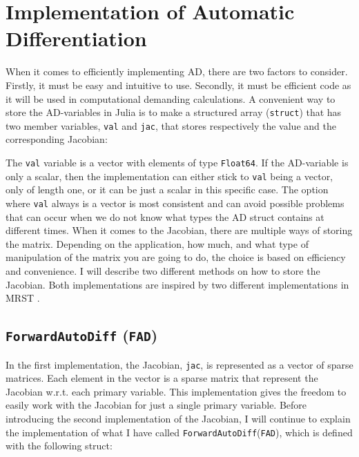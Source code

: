 \section{Implementation of Automatic Differentiation}
\label{sec:ImplementationAD}
When it comes to efficiently implementing AD, there are two factors to consider. Firstly, it must be easy and intuitive to use. Secondly, it must be efficient code as it will be used in computational demanding calculations. A convenient way to store the AD-variables in Julia is to make a structured array (\texttt{struct}) that has two member variables, \texttt{val} and \texttt{jac}, that stores respectively the value and the corresponding Jacobian: 
 
The \texttt{val} variable is a vector with elements of type \texttt{Float64}. If the AD-variable is only a scalar, then the implementation can either stick to \texttt{val} being a vector, only of length one, or it can be just a scalar in this specific case. The option where \texttt{val} always is a vector is most consistent and can avoid possible problems that can occur when we do not know what types the AD struct contains at different times. When it comes to the Jacobian, there are multiple ways of storing the matrix. Depending on the application, how much, and what type of manipulation of the matrix you are going to do, the choice is based on efficiency and convenience. I will describe two different methods on how to store the Jacobian. Both implementations are inspired by two different implementations in MRST \emph{\citep{lieMrstUrl}}. 

\subsection{\texttt{ForwardAutoDiff} (\texttt{FAD})}
\label{sec:FAD}
In the first implementation, the Jacobian, \texttt{jac}, is represented as a vector of sparse matrices. Each element in the vector is a sparse matrix that represent the Jacobian w.r.t. each primary variable. This implementation gives the freedom to easily work with the Jacobian for just a single primary variable. Before introducing the second implementation of the Jacobian, I will continue to explain the implementation of what I have called \texttt{ForwardAutoDiff}(\texttt{FAD}), which is defined with the following struct:




